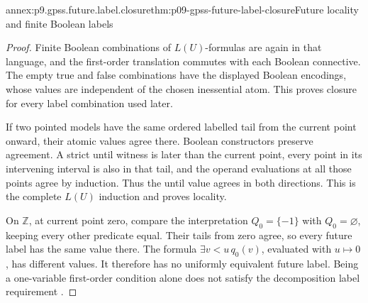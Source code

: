\begin{annexitem}{annex:p9.gpss.future.label.closure}{thm:p09-gpss-future-label-closure}{Future locality and finite Boolean labels}
\begin{proof}
Finite Boolean combinations of \(L(U)\)-formulas are
again in that language, and the first-order translation
commutes with each Boolean connective. The empty true
and false combinations have the displayed Boolean
encodings, whose values are independent of the chosen
inessential atom. This proves closure for every label
combination used later.

If two pointed models have the same ordered labelled
tail from the current point onward, their atomic values
agree there. Boolean constructors preserve agreement.
A strict until witness is later than the current
point, every point in its intervening interval is
also in that tail, and the operand evaluations at
all those points agree by induction. Thus the
until value agrees in both directions. This is
the complete \(L(U)\) induction and proves locality.

On \(\mathbb Z\), at current point zero, compare
the interpretation \(Q_0=\{-1\}\) with
\(Q_0=\varnothing\), keeping every other predicate
equal. Their tails from zero agree, so every
future label has the same value there. The formula
\(\exists v<u\,q_0(v)\), evaluated with \(u\mapsto0\),
has different values.
It therefore has no uniformly equivalent future
label. Being a one-variable first-order condition
alone does not satisfy the decomposition label
requirement
\cite[pp.~169--170]{GabbayPnueliShelahStavi1980}.
\end{proof}
\end{annexitem}

